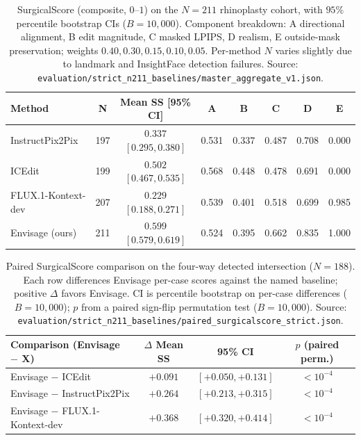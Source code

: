 \documentclass{article}
\newcommand{\method}{Envisage}
\newcommand{\best}[1]{\textbf{#1}}
\begin{document}
\begin{table}[h]
\centering
\small
\caption{SurgicalScore (composite, $0$--$1$) on the $N{=}211$ rhinoplasty
cohort, with $95\%$ percentile bootstrap CIs ($B{=}10{,}000$). Component
breakdown: A directional alignment, B edit magnitude, C masked LPIPS, D
realism, E outside-mask preservation; weights $0.40, 0.30, 0.15, 0.10, 0.05$.
Per-method $N$ varies slightly due to landmark and InsightFace detection
failures. Source:
\texttt{evaluation/strict\_n211\_baselines/master\_aggregate\_v1.json}.}
\label{tab:ss_strict_n211}
\begin{tabular}{@{}lccccccc@{}}
\toprule
\textbf{Method} & \textbf{N} & \textbf{Mean SS [95\% CI]} & \textbf{A} & \textbf{B} & \textbf{C} & \textbf{D} & \textbf{E} \\
\midrule
InstructPix2Pix     & 197 & $0.337$ $[0.295, 0.380]$ & 0.531 & 0.337 & 0.487 & 0.708 & 0.000 \\
ICEdit              & 199 & $0.502$ $[0.467, 0.535]$ & 0.568 & 0.448 & 0.478 & 0.691 & 0.000 \\
FLUX.1-Kontext-dev  & 207 & $0.229$ $[0.188, 0.271]$ & 0.539 & 0.401 & 0.518 & 0.699 & 0.985 \\
\method{} (ours)    & 211 & \best{$0.599$ $[0.579, 0.619]$} & 0.524 & 0.395 & 0.662 & 0.835 & 1.000 \\
\bottomrule
\end{tabular}
\end{table}

\begin{table}[h]
\centering
\small
\caption{Paired SurgicalScore comparison on the four-way detected intersection
($N{=}188$). Each row differences \method{} per-case scores against the named
baseline; positive $\Delta$ favors \method{}. CI is percentile bootstrap on
per-case differences ($B{=}10{,}000$); $p$ from a paired sign-flip permutation
test ($B{=}10{,}000$). Source:
\texttt{evaluation/strict\_n211\_baselines/paired\_surgicalscore\_strict.json}.}
\label{tab:ss_paired_strict}
\begin{tabular}{@{}lccc@{}}
\toprule
\textbf{Comparison (\method{} $-$ X)} & \textbf{$\Delta$ Mean SS} & \textbf{95\% CI} & \textbf{$p$ (paired perm.)} \\
\midrule
\method{} $-$ ICEdit             & $+0.091$ & $[+0.050, +0.131]$ & $<10^{-4}$ \\
\method{} $-$ InstructPix2Pix    & $+0.264$ & $[+0.213, +0.315]$ & $<10^{-4}$ \\
\method{} $-$ FLUX.1-Kontext-dev  & $+0.368$ & $[+0.320, +0.414]$ & $<10^{-4}$ \\
\bottomrule
\end{tabular}
\end{table}
\end{document}
